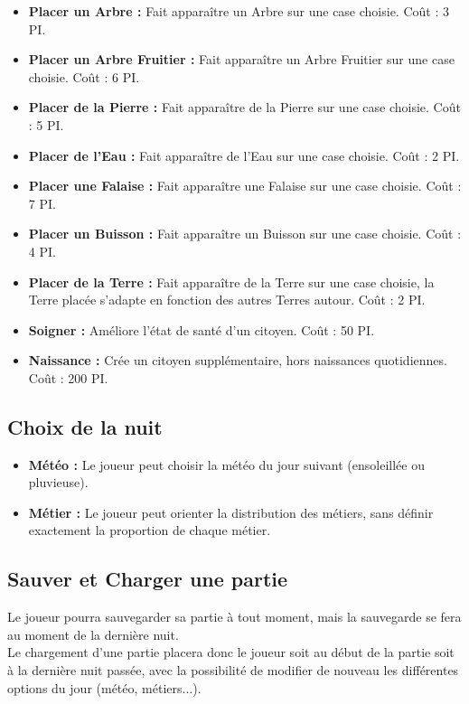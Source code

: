 \documentclass[a4paper]{memoir}
\begin{document}
				\begin{itemize}[label=$\bullet$]
					\item \textbf{Placer un Arbre :} Fait apparaître un Arbre sur une case choisie. Coût : 3 PI.
					\item \textbf{Placer un Arbre Fruitier :} Fait apparaître un Arbre Fruitier sur une case choisie. Coût : 6 PI.
					\item \textbf{Placer de la Pierre :} Fait apparaître de la Pierre sur une case choisie. Coût : 5 PI.
					\item \textbf{Placer de l'Eau :} Fait apparaître de l'Eau sur une case choisie. Coût : 2 PI.
					\item \textbf{Placer une Falaise :} Fait apparaître une Falaise sur une case choisie. Coût : 7 PI.
					\item \textbf{Placer un Buisson :} Fait apparaître un Buisson sur une case choisie. Coût : 4 PI.
					\item \textbf{Placer de la Terre :} Fait apparaître de la Terre sur une case choisie, la Terre placée s'adapte en fonction des autres Terres autour. Coût : 2 PI.
				\end{itemize}
				\begin{itemize}[label=$\bullet$]
					\item \textbf{Soigner :} Améliore l'état de santé d'un citoyen. Coût : 50 PI.
					\item \textbf{Naissance :} Crée un citoyen supplémentaire, hors naissances quotidiennes. Coût : 200 PI.
				\end{itemize}

			\subsection{Choix de la nuit}
				\begin{itemize}[label=$\bullet$]
					\item \textbf{Météo :} Le joueur peut choisir la météo du jour suivant (ensoleillée ou pluvieuse).
					\item \textbf{Métier :} Le joueur peut orienter la distribution des métiers, sans définir exactement la proportion de chaque métier.
				\end{itemize}
		
			\subsection{Sauver et Charger une partie}
				Le joueur pourra sauvegarder sa partie à tout moment, mais la sauvegarde se fera au moment de la dernière nuit.\\
				Le chargement d'une partie placera donc le joueur soit au début de la partie soit à la dernière nuit passée, avec la possibilité de modifier de nouveau les différentes options du jour (météo, métiers...).
	
\end{document}
